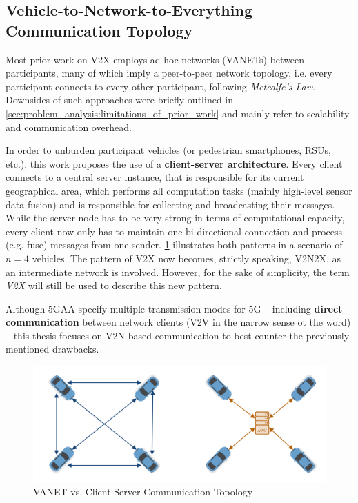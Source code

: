 \subsection{Vehicle-to-Network-to-Everything Communication Topology}
\label{subsec:concept_design:communication_topology}
Most prior work on V2X employs ad-hoc networks (VANETs) between participants, many of which imply a peer-to-peer network topology, i.e. every participant connects to every other participant, following \textit{Metcalfe's Law}. Downsides of such approaches were briefly outlined in \cref{sec:problem_analysis:limitations_of_prior_work} and mainly refer to scalability and communication overhead.

In order to unburden participant vehicles (or pedestrian smartphones, RSUs, etc.), this work proposes the use of a \textbf{client-server architecture}. Every client connects to a central server instance, that is responsible for its current geographical area, which performs all computation tasks (mainly high-level sensor data fusion) and is responsible for collecting and broadcasting their messages. While the server node has to be very strong in terms of computational capacity, every client now only has to maintain one bi-directional connection and process (e.g. fuse) messages from one sender. \cref{fig:communication_topology} illustrates both patterns in a scenario of $n = 4$ vehicles. The pattern of V2X now becomes, strictly speaking, V2N2X, as an intermediate network is involved. However, for the sake of simplicity, the term \textit{V2X} will still be used to describe this new pattern. 

Although 5GAA specify multiple transmission modes for 5G \cite{5GAutomotiveAssociation2016} – including \textbf{direct communication} between network clients (V2V in the narrow sense ot the word) – this thesis focuses on V2N-based communication to best counter the previously mentioned drawbacks. 

\begin{figure}[h]
	\centering
	\includegraphics[width=0.9\linewidth]{98_images/topology_comparison}
	\caption{VANET vs. Client-Server Communication Topology}
	\label{fig:communication_topology}
\end{figure}


